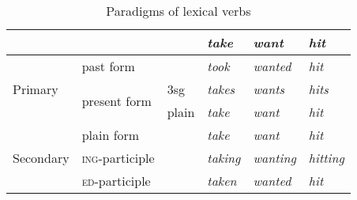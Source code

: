 \documentclass[UTF8, a4paper, oneside, scheme=plain]{ctexrep}
\newcommand{\corpus}[1]{\emph{#1}}
\newcommand{\corpuscat}[1]{\textsc{#1}}
\begin{document}
\begin{table}[H]
    \caption{Paradigms of lexical verbs}
    \label{tbl:lexical-inflection}
    \centering
    \begin{tabular}{@{}llllll@{}}
    \toprule
    \multicolumn{1}{l}{}       &                               &       & \corpus{take}   & \corpus{want}    & \corpus{hit}     \\ \midrule
    \multirow{3}{*}{Primary}   & past form                     &       & \corpus{took}   & \corpus{wanted}  & \corpus{hit}     \\
                               & \multirow{2}{*}{present form} & 3sg   & \corpus{takes}  & \corpus{wants}   & \corpus{hits}    \\
                               &                               & plain & \corpus{take}   & \corpus{want}    & \corpus{hit}     \\ \midrule
    \multirow{3}{*}{Secondary} & plain form                    &       & \corpus{take}   & \corpus{want}    & \corpus{hit}     \\
                               & \corpuscat{ing}-participle       &       & \corpus{taking} & \corpus{wanting} & \corpus{hitting} \\
                               & \corpuscat{ed}-participle        &       & \corpus{taken}  & \corpus{wanted}  & \corpus{hit}     \\ \bottomrule
    \end{tabular}
\end{table}
\end{document}

